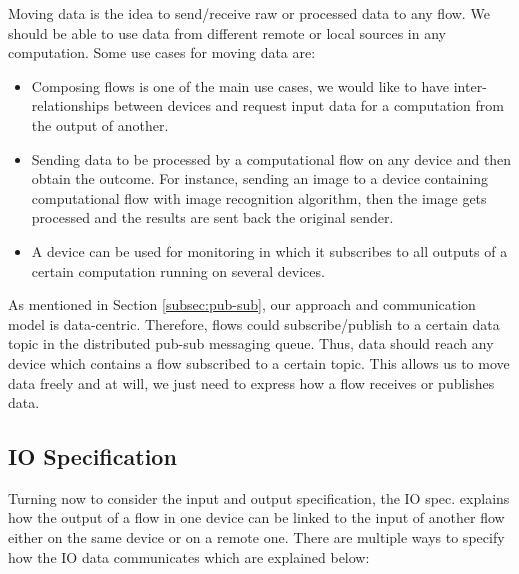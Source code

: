 Moving data is the idea  to send/receive raw or processed data to any flow. We should be  able to use data from different remote or local sources in any computation. Some use cases for moving data are:
\begin{itemize}
\item Composing flows is one of the main use cases, we would like to have inter-relationships between devices and  request input data for a computation from the output of another.

\item Sending data to be processed by a computational flow on any device and then obtain the outcome. For instance, sending an image to a device containing computational flow with image recognition algorithm, then the image gets processed and the results are sent back the original sender. 

\item A device can be used for monitoring  in which it subscribes to all outputs of a certain computation running on several devices.

\end{itemize} 
 As mentioned in Section \ref{subsec:pub-sub}, our approach and communication model is data-centric. Therefore, flows could subscribe/publish to a certain data topic in the distributed pub-sub messaging queue. Thus, data should reach any device which contains a flow subscribed to a certain topic. This allows us to move data freely and at will, we just need to express how a flow receives or publishes data.

\subsection{IO Specification}\label{subsec:io-spec}
Turning now to consider the input and output specification, the IO spec. explains how the output of a flow in one device can be linked to the input of another flow either on the same device or on a remote one. There are multiple ways to specify how the IO data communicates which are explained below:


